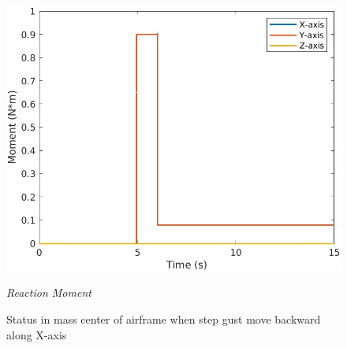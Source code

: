 \begin{figure}[htbp]
\begin{minipage}[b]{0.3\textwidth}
    \centering
    \includegraphics[width=\textwidth]{Images/Gust/FIXED/3 moment_1.jpg}
    \caption*{\textit{Reaction Moment}}
  \end{minipage}
  \caption{Status in mass center of airframe when step gust move backward along X-axis}
  \label{fig:fixed -x}
\end{figure}

